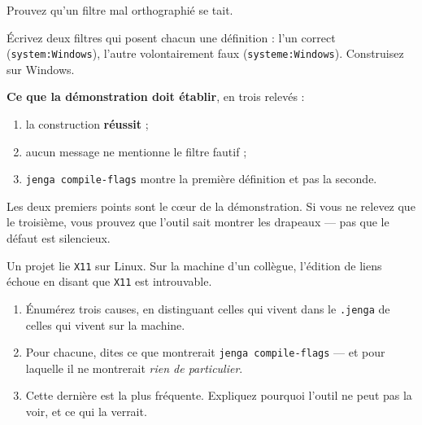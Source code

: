 \begin{nkdemo}
Prouvez qu'un filtre mal orthographié se tait.

Écrivez deux filtres qui posent chacun une définition : l'un correct
(\texttt{system:Windows}), l'autre volontairement faux
(\texttt{systeme:Windows}). Construisez sur Windows.

\textbf{Ce que la démonstration doit établir}, en trois relevés :
\begin{enumerate}
\item la construction \textbf{réussit} ;
\item aucun message ne mentionne le filtre fautif ;
\item \texttt{jenga compile-flags} montre la première définition et pas la
      seconde.
\end{enumerate}

\alerte{} Les deux premiers points sont le cœur de la démonstration. Si vous ne relevez
que le troisième, vous prouvez que l'outil sait montrer les drapeaux --- pas que
le défaut est silencieux.
\end{nkdemo}

\begin{nklogique}
Un projet lie \texttt{X11} sur Linux. Sur la machine d'un collègue, l'édition de
liens échoue en disant que \texttt{X11} est introuvable.

\begin{enumerate}
\item Énumérez trois causes, en distinguant celles qui vivent dans le
      \texttt{.jenga} de celles qui vivent sur la machine.
\item Pour chacune, dites ce que montrerait \texttt{jenga compile-flags} --- et
      pour laquelle il ne montrerait \emph{rien de particulier}.
\item Cette dernière est la plus fréquente. Expliquez pourquoi l'outil ne peut
      pas la voir, et ce qui la verrait.
\end{enumerate}
\end{nklogique}
